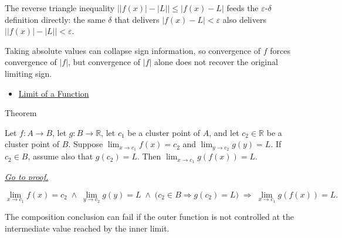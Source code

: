 \begin{remark*}
The reverse triangle inequality
$\bigl||f(x)| - |L|\bigr| \leq |f(x) - L|$
feeds the $\varepsilon$-$\delta$ definition directly: the same
$\delta$ that delivers $|f(x)-L|<\varepsilon$
also delivers $\bigl||f(x)|-|L|\bigr|<\varepsilon$.
\end{remark*}

\begin{remark*}[Interpretation]
Taking absolute values can collapse sign information, so convergence of
$f$ forces convergence of $|f|$, but convergence of $|f|$ alone does not
recover the original limiting sign.
\end{remark*}

\begin{dependencies}
\begin{itemize}
  \item \hyperref[def:limit-function]{Limit of a Function}
\end{itemize}
\end{dependencies}


\begin{theorembox}{Theorem}
\begin{theorem}
\label{thm:composition-of-limits}
Let $f : A \to B$, let $g : B \to \mathbb{R}$, let $c_1$ be a
cluster point of $A$, and let $c_2 \in \mathbb{R}$ be a cluster
point of $B$. Suppose $\lim_{x\to c_1}f(x)=c_2$ and
$\lim_{y\to c_2}g(y)=L$. If $c_2 \in B$, assume also that
$g(c_2) = L$. Then $\lim_{x\to c_1}g(f(x))=L$.

\smallskip\noindent
\hyperref[prf:composition-of-limits]{\textit{Go to proof.}}
\end{theorem}
\end{theorembox}

\begin{remark*}
\[
  \lim_{x\to c_1}f(x)=c_2
  \;\wedge\;
  \lim_{y\to c_2}g(y)=L
  \;\wedge\;
  \bigl(c_2 \in B \Rightarrow g(c_2) = L\bigr)
  \;\Rightarrow\;
  \lim_{x\to c_1}g(f(x))=L.
\]
\end{remark*}

\begin{remark*}
The composition conclusion can fail if the outer function is not controlled
at the intermediate value reached by the inner limit.
\end{remark*}

